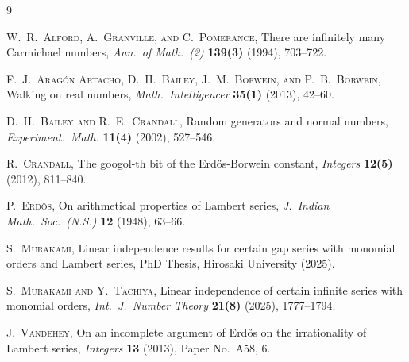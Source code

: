 \documentclass[12pt]{article}
\begin{document}
\begin{thebibliography}{9}

 \textsc{W.\ R.\ Alford, A.\ Granville, and C.\ Pomerance}, 
 There are infinitely many {C}armichael numbers, 
 \emph{Ann.\ of Math.\ (2)} {\bf 139(3)} (1994), 703--722. 

 \textsc{F.\ J.\ Arag\'on Artacho, D.\ H.\ Bailey, J.\ M.\ Borwein, and P.\ B.\ Borwein}, 
 Walking on real numbers, 
 \emph{Math.\ Intelligencer} {\bf 35(1)} (2013), 42--60. 

 \textsc{D.\ H.\ Bailey and R.\ E.\ Crandall}, 
 Random generators and normal numbers, 
 \emph{Experiment.\ Math.} {\bf 11(4)} (2002), 527--546. 
 
 \textsc{R.\ Crandall}, 
 The googol-th bit of the {E}rd\H os-{B}orwein constant, 
 \emph{Integers} {\bf 12(5)} (2012), 811--840. 

 \textsc{P.\ Erd\"os}, 
 On arithmetical properties of {L}ambert series, 
 \emph{J.\ Indian Math.\ Soc.\ (N.S.)} {\bf 12} (1948), 63--66. 

 \textsc{S.\ Murakami}, 
 Linear independence results for certain gap series with monomial orders and Lambert series, 
 PhD Thesis, Hirosaki University (2025). 

 \textsc{S.\ Murakami and Y.\ Tachiya}, 
 Linear independence of certain infinite series with monomial orders, 
 \emph{Int.\ J.\ Number Theory} {\bf 21(8)} (2025), 1777--1794. 

 \textsc{J.\ Vandehey}, 
 On an incomplete argument of {E}rd\H os on the irrationality of {L}ambert series, 
 \emph{Integers} {\bf 13} (2013), Paper No.\ A58, 6. 

\end{thebibliography}
\end{document}
